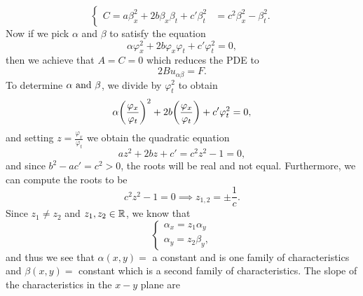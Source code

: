 \documentclass[12pt]{report}
\begin{document}
\begin{solution}
\[\begin{cases}
            C = a \beta_x^2 + 2b\beta_x \beta_t + c'\beta_t^2 &= c^2 \beta_x^2 - \beta_t^2. 
        \end{cases}
    \]
    Now if we pick $\alpha$ and $\beta$ to satisfy the equation
    \[ 
        \alpha \varphi_x^2 + 2b \varphi_x \varphi_t + c' \varphi_t^2 = 0, 
    \]
    then we achieve that $A = C = 0$ which reduces the PDE to 
    \[ 
        2Bu_{\alpha \beta} = F.
    \]
    To determine $\alpha {~\text{and}~} \beta$, we divide by $\varphi_t^2$ to obtain
    \[ 
        \alpha {\left(\frac{\varphi_x}{\varphi_t}\right)}^2 + 2b {\left(\frac{\varphi_x}{\varphi_t}\right)} + c' \varphi_t^2 = 0, 
    \]
    and setting $z = \frac{\varphi_x}{\varphi_t}$ we obtain the quadratic equation
    \[ 
        az^2 + 2bz + c' =  c^2z^2 - 1 = 0,
    \]  
    and since $b^2 - ac'= c^2 > 0$, the roots will be real and not equal. Furthermore, we can compute the roots to be 
    \[ 
        c^2z^2 - 1 = 0 \implies z_{1,2} = \pm \frac{1}{c}.
    \] 
    Since $z_1 \neq z_2$ and $z_1, z_2 \in {\mathbb R}$, we know that
    \[ 
        \begin{cases}
            \alpha_x = z_1 \alpha_y\\
            \alpha_y = z_2 \beta_y,
        \end{cases}
    \]
    and thus we see that $\alpha(x,y) =$ a constant and is one family of characteristics and $\beta(x,y)=$ constant which is a second family of characteristics. The slope of the characteristics in the $x-y$ plane are
    

\end{solution}
\end{document}
